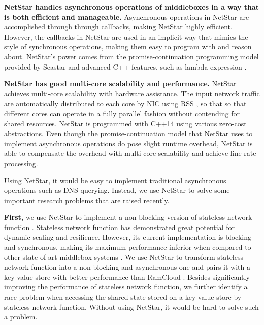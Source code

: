 \textbf{NetStar handles asynchronous operations of middleboxes in a way that is both efficient and manageable.} Asynchronous operations in NetStar are accomplished through through callbacks, making NetStar highly efficient. However, the callbacks in NetStar are used in an implicit way that mimics the style of synchronous operations, making them easy to program with and reason about. NetStar's power comes from the promise-continuation programming model provided by Seastar \cite{} and advanced C++ features, such as lambda expression \cite{}.

\textbf{NetStar has good multi-core scalability and performance.} NetStar achieves multi-core scalability with hardware assistance. The input network traffic are automatically distributed to each core by NIC using RSS \cite{}, so that so that different cores can operate in a fully parallel fashion without contending for shared resources. NetStar is programmed with C++14 using various zero-cost abstractions. Even though the promise-continuation model that NetStar uses to implement asynchronous operations do pose slight runtime overhead, NetStar is able to compensate the overhead with multi-core scalability and achieve line-rate processing.

Using NetStar, it would be easy to implement traditional asynchronous operations such as DNS querying. Instead, we use NetStar to solve some important research problems that are raised recently.

\textbf{First,} we use NetStar to implement a non-blocking version of stateless network function \cite{}. Stateless network function \cite{} has demonstrated great potential for dynamic scaling and resilience. However, its current implementation is blocking and synchronous, making its maximum performance inferior when compared to other state-of-art middlebox systems \cite{}. We use NetStar to transform stateless network function into a non-blocking and asynchronous one and pairs it with a key-value store \cite{} with better performance than RamCloud \cite{}. Besides significantly improving the performance of stateless network function, we further identify a race problem when accessing the shared state stored on a key-value store by stateless network function. Without using NetStar, it would be hard to solve such a problem.





